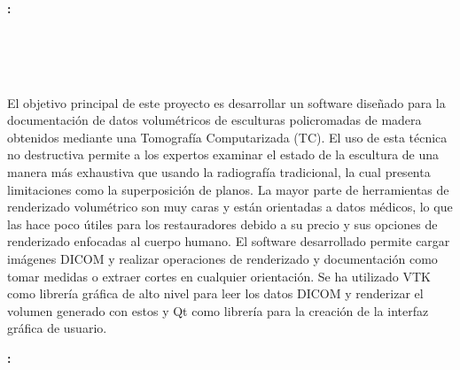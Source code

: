 \chapter*{}



\cleardoublepage
\thispagestyle{empty}

\begin{center}
{\large\bfseries \myTitle: \mySubtitle}\\
\end{center}

\begin{center}
\myName \\
\end{center}

\vspace{0.7cm}
\\

\vspace{0.7cm}
\\

El objetivo principal de este proyecto es desarrollar un software diseñado para la documentación de datos volumétricos de esculturas policromadas de madera obtenidos mediante una Tomografía Computarizada (TC). El uso de esta técnica no destructiva permite a los expertos examinar el estado de la escultura de una manera más exhaustiva que usando la radiografía tradicional, la cual presenta limitaciones como la superposición de planos. La mayor parte de herramientas de renderizado volumétrico son muy caras y están orientadas a datos médicos, lo que las hace poco útiles para los restauradores debido a su precio y sus opciones de renderizado enfocadas al cuerpo humano. El software desarrollado permite cargar imágenes DICOM y realizar operaciones de renderizado y documentación como tomar medidas o extraer cortes en cualquier orientación. Se ha utilizado VTK como librería gráfica de alto nivel para leer los datos DICOM y renderizar el volumen generado con estos y Qt como librería para la creación de la interfaz gráfica de usuario.

\thispagestyle{empty}

\cleardoublepage

\begin{center}
	{\large\bfseries \myTitle: \myEnglishSubtitle}\\
\end{center}

